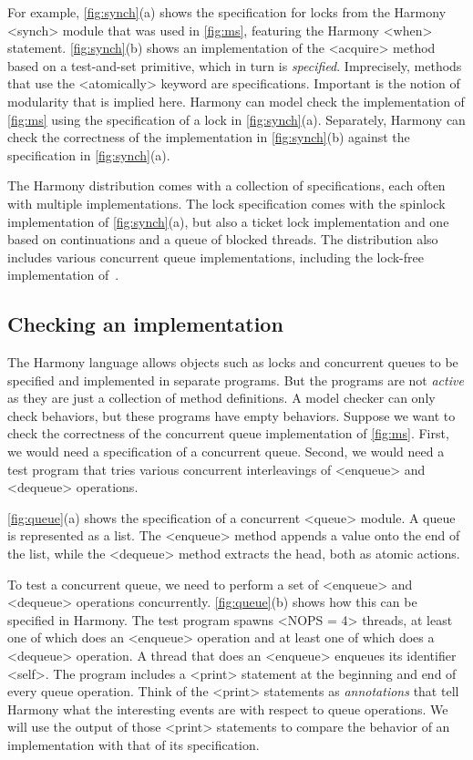 \documentclass[twocolumn]{article}
\begin{document}
For example, \autoref{fig:synch}(a) shows the specification for locks
from the Harmony <{synch}> module that was used in \autoref{fig:ms},
featuring the Harmony <{when}> statement.
\autoref{fig:synch}(b) shows an implementation of the <{acquire}>
method based on a test-and-set primitive, which in turn is
\emph{specified}.
Imprecisely, methods that use the <{atomically}> keyword are specifications.
Important is the notion of modularity that is implied here.
Harmony can model check the implementation of \autoref{fig:ms} using
the specification of a lock in \autoref{fig:synch}(a).
Separately, Harmony can check the correctness of the implementation in
\autoref{fig:synch}(b) against the specification in
\autoref{fig:synch}(a).

The Harmony distribution comes with a collection of specifications,
each often with multiple implementations.  The lock specification
comes with the spinlock implementation of \autoref{fig:synch}(a), but
also a ticket lock implementation and one based on continuations and
a queue of blocked threads.  The distribution also includes various concurrent
queue implementations, including the lock-free implementation
of~\cite{MS96}.

\subsection{Checking an implementation}

The Harmony language allows objects such as locks and concurrent queues
to be specified and implemented in separate programs.  But the programs
are not \emph{active} as they are just a collection of method definitions.
A model checker can only check behaviors, but these programs have empty
behaviors.
Suppose we want to check the correctness of the concurrent queue
implementation of \autoref{fig:ms}.  First, we would need a specification
of a concurrent queue.  Second, we would need a test program that tries
various concurrent interleavings of <{enqueue}> and <{dequeue}> operations.

\autoref{fig:queue}(a) shows the specification of a concurrent
<{queue}> module.  A queue is represented as a list.
The <{enqueue}> method appends a value onto the end of the list,
while the <{dequeue}> method extracts the head, both as atomic actions.

To test a concurrent queue, we need to perform a set of <{enqueue}>
and <{dequeue}> operations concurrently.  \autoref{fig:queue}(b)
shows how this can be specified in Harmony.  The test program spawns
<{NOPS = 4}> threads, at least one of which does an <{enqueue}>
operation and at least one of which does a <{dequeue}> operation.
A thread that does an <{enqueue}> enqueues its identifier <{self}>.
The program includes a <{print}> statement at the beginning and end
of every queue operation.  Think of the <{print}> statements as
\emph{annotations} that tell Harmony what the interesting events
are with respect to queue operations.  We will use the output of
those <{print}> statements to compare the behavior of an implementation
with that of its specification.
\end{document}
